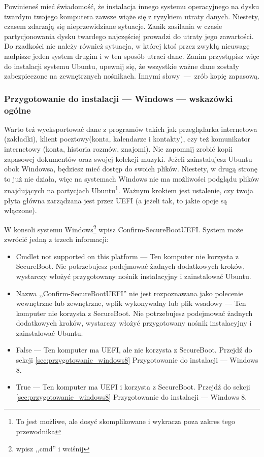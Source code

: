 \label{sec:przygotowanie_windows}Powinieneś mieć świadomość, że instalacja innego systemu operacyjnego na dysku twardym twojego komputera zawsze wiąże się z ryzykiem utraty danych. Niestety, czasem zdarzają się nieprzewidziane sytuacje. Zanik zasilania w czasie partycjonowania dysku twardego najczęściej prowadzi do utraty jego zawartości. Do rzadkości nie należy również sytuacja, w której ktoś przez zwykłą nieuwagę  nadpisze jeden system drugim i w ten sposób utraci dane. Zanim przystąpisz więc do instalacji systemu Ubuntu, upewnij się, że wszystkie ważne dane zostały zabezpieczone na zewnętrznych nośnikach. Innymi słowy~---~zrób kopię zapasową.

\subsubsection{Przygotowanie do instalacji --- Windows --- wskazówki ogólne}
Warto też wyeksportować dane z programów takich jak przeglądarka internetowa (zakładki), klient pocztowy(konta, kalendarze i kontakty), czy też komunikator internetowy (konta, historia rozmów, znajomi). Nie zapomnij zrobić kopii zapasowej dokumentów oraz swojej kolekcji muzyki. Jeżeli zainstalujesz Ubuntu obok Windowsa, będziesz mieć dostęp do swoich plików. Niestety, w drugą stronę to już nie działa, więc na systemach Windows nie ma możliwości podglądu plików znajdujących na partycjach Ubuntu\footnote{To jest możliwe, ale dosyć skomplikowane i wykracza poza zakres tego przewodnika}.
Ważnym krokiem jest ustalenie, czy twoja płyta główna zarządzana jest przez UEFI (a jeżeli tak, to jakie opcje są włączone).

W konsoli systemu Windows\footnote{ wpisz ,,cmd'' i wciśnij \keys{\returnwin}} wpisz \textcolor{ubuntu_orange}{Confirm-SecureBootUEFI}. System może zwrócić jedną z trzech informacji:
\begin{itemize}
\item \textcolor{ubuntu_orange}{Cmdlet not supported on this platform} --- Ten komputer nie korzysta z SecureBoot. Nie potrzebujesz podejmować żadnych dodatkowych kroków, wystarczy włożyć przygotowany nośnik instalacyjny i zainstalować Ubuntu.
\item \textcolor{ubuntu_orange}{Nazwa ,,Confirm-SecureBootUEFI'' nie jest rozpoznawana jako polecenie wewnętrzne lub zewnętrzne, wplik wykonywalny lub plik wsadowy} --- Ten komputer nie korzysta z SecureBoot. Nie potrzebujesz podejmować żadnych dodatkowych kroków, wystarczy włożyć przygotowany nośnik instalacyjny i zainstalować Ubuntu.
\item \textcolor{ubuntu_orange}{False} --- Ten komputer ma UEFI, ale nie korzysta z SecureBoot. Przejdź do sekcji \ref{sec:przygotowanie_windows8} Przygotowanie do instalacji --- Windows 8.
\item \textcolor{ubuntu_orange}{True} --- Ten komputer ma UEFI i korzysta z SecureBoot. Przejdź do sekcji \ref{sec:przygotowanie_windows8} Przygotowanie do instalacji --- Windows 8.
\end{itemize}
